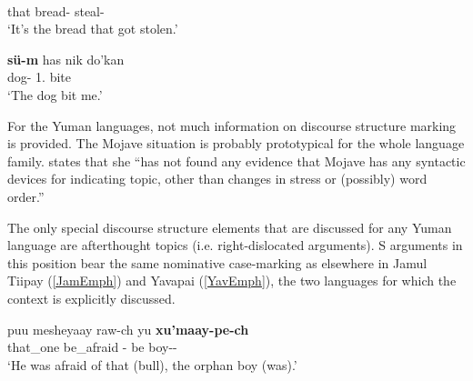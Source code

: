\begin{exe}\ex\label{WapEmph}
\gll{}   \\
that bread-\nom{} \foc{} steal-\pass{}\\
\glt `It's the bread that got stolen.'
\end{exe}

\begin{exe} \ex\label{MaiEmph}
 \gll \textbf{s\"u-m} has nik do'kan\\
dog-\nom{} \emphat{} 1\sg{}.\acc{} bite\\
\glt `The dog bit me.' 
\end{exe}

For the Yuman languages, not much information on discourse structure marking is provided. 
The Mojave situation is probably prototypical for the whole language family. 
\citet[276]{Munro:1976} states that she ``has not found any evidence that Mojave has any syntactic devices for indicating topic, other than changes in stress or (possibly) word order.''

The only special discourse structure elements that are discussed for any Yuman language are afterthought topics (i.e. right-dislocated arguments).
S arguments in this position bear the same nominative  case-marking as elsewhere in Jamul Tiipay (\ref{JamEmph}) and Yavapai (\ref{YavEmph}), the two languages for which the context is explicitly discussed.

\begin{exe} \ex\label{JamEmph}
\gll\textipa puu mesheyaay raw-ch yu \textbf{xu'maay-pe-ch}\\
that\_one be\_afraid \ipfv{}-\ssbj{} be boy-\dem{}-\nom{}\\
\glt `He was afraid of that (bull), the orphan boy (was).' 
\end{exe}

